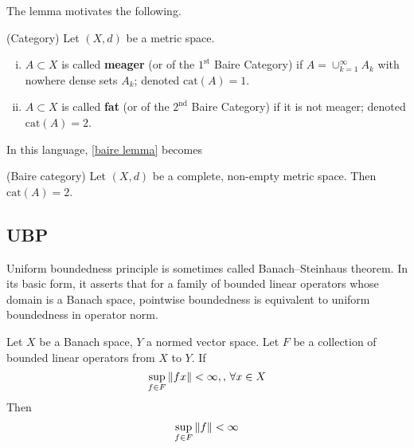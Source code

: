 \documentclass{article}
\begin{document}
\begin{flushleft}
The lemma motivates the following.  
\end{flushleft}


\begin{definition}
    (Category)  
    Let $(X,d)$ be a metric space.  
\end{definition}
\begin{enumerate}[i)]
    \item $A \subset X$ is called \textbf{meager} (or of the $1^{\textrm{st}}$ Baire Category) if $A = \cup_{k=1}^{\infty} A_k$ with nowhere dense sets $A_k$; denoted $\textrm{cat}(A)=1$.  
    \item $A \subset X$ is called \textbf{fat} (or of the $2^{\textrm{nd}}$ Baire Category) if it is not meager; denoted $\textrm{cat}(A)=2$.  
\end{enumerate}  

In this language, \cref{baire lemma} becomes  

\begin{theorem}
(Baire category)  
Let  $(X,d)$ be a complete, non-empty metric space. Then $\textrm{cat}(A)=2$.  
\end{theorem}  

\begin{remark}

\end{remark}

\subsection{UBP}
\begin{flushleft}
Uniform boundedness principle is sometimes called Banach–Steinhaus theorem. In its basic form, it asserts that for a family of bounded linear operators  whose domain is a Banach space, pointwise boundedness is equivalent to uniform boundedness in operator norm.
\end{flushleft}


\begin{theorem} %
	Let $X$ be a Banach space, $Y$ a normed vector space. Let $F$ be a collection of bounded linear operators from $X$ to $Y$. If
	$$
		\sup_{f\in F}\left\|{fx}\right\|<\infty,,\,\forall x\in X
	$$
	Then
	$$
		\sup_{f\in F}\left\|{f}\right\|<\infty
	$$
\end{theorem}
\end{document}
